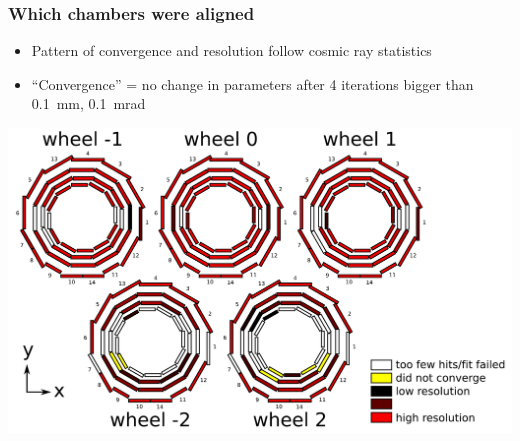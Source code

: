 \documentclass[compress]{beamer}
\begin{document}
\begin{frame}
\frametitle{Which chambers were aligned}

\begin{itemize}
\item Pattern of convergence and resolution follow cosmic ray statistics
\item ``Convergence'' = no change in parameters after 4 iterations
  bigger than 0.1~mm, 0.1~mrad
\end{itemize}

\vfill
\includegraphics[width=\linewidth]{data_convergence.pdf}
\end{frame}
\end{document}
